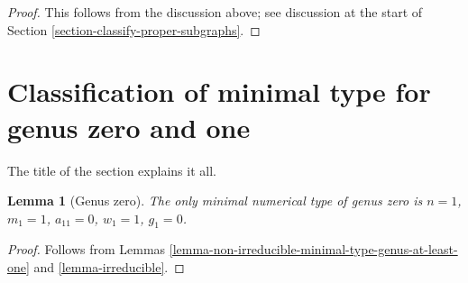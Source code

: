 \documentclass{stacks-project}
\theoremstyle{plain}
\newtheorem{lemma}[subsection]{Lemma}
\theoremstyle{definition}
\theoremstyle{remark}
\numberwithin{equation}{subsection}
\begin{document}
\begin{proof}
This follows from the discussion above; see discussion at the
start of Section \ref{section-classify-proper-subgraphs}.
\end{proof}













\section{Classification of minimal type for genus zero and one}
\label{section-classification-genus-one}

\noindent
The title of the section explains it all.

\begin{lemma}[Genus zero]
\label{lemma-genus-zero}
The only minimal numerical type of genus zero is
$n = 1$, $m_1 = 1$, $a_{11} = 0$, $w_1 = 1$, $g_1 = 0$.
\end{lemma}

\begin{proof}
Follows from Lemmas \ref{lemma-non-irreducible-minimal-type-genus-at-least-one}
and \ref{lemma-irreducible}.
\end{proof}
\end{document}
